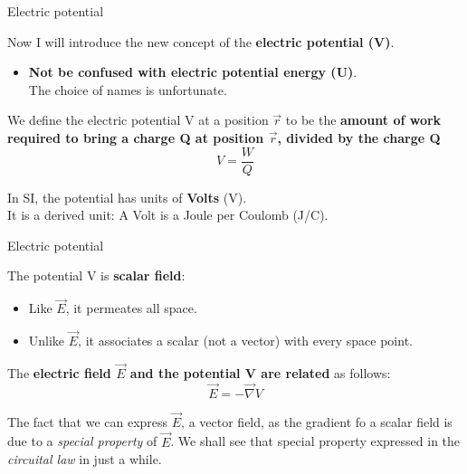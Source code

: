 \begin{frame}{Electric potential}

Now I will introduce the new concept of the {\bf electric potential (V)}.\\

\vspace{0.2cm}

\begin{itemize}
 \item {\bf Not be confused with electric potential energy (U)}. \\
       The choice of names is unfortunate.
\end{itemize}

\vspace{0.1cm}

We define the electric potential V at a position $\vec{r}$ to be the
{\bf amount of work required to bring a charge Q at position $\vec{r}$, divided by the charge Q}
\begin{equation*}
    V = \frac{W}{Q}
\end{equation*}

\vspace{0.1cm}

In SI, the potential has units of {\bf Volts} (V). \\
It is a derived unit: A Volt is a Joule per Coulomb (J/C).\\


\end{frame}

%
%
%

\begin{frame}{Electric potential}

The potential V is {\bf scalar field}:
\begin{itemize}
 \item
   Like $\vec{E}$, it permeates all space.
 \item
   Unlike $\vec{E}$, it associates a scalar (not a vector) with every space point.
\end{itemize}

\vspace{0.3cm}

The {\bf electric field $\vec{E}$ and the potential V are related} as follows:
\begin{equation*}
   \vec{E} = - \vec{\nabla} V
\end{equation*}

The fact that we can express $\vec{E}$, a vector field, as the gradient fo a scalar
field is due to a {\em special property} of $\vec{E}$.
We shall see that special property expressed in the {\em circuital law} in just a while.\\

\end{frame}

